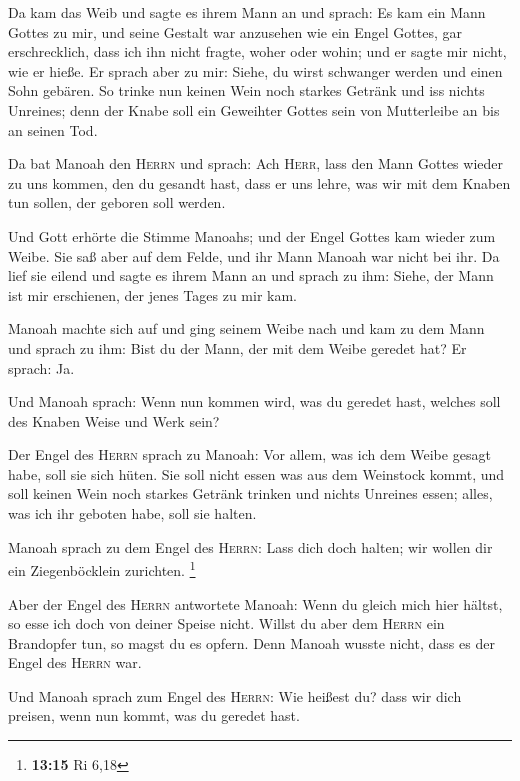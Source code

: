  Da kam das Weib und sagte es ihrem Mann an und sprach: Es
kam ein Mann Gottes zu mir, und seine Gestalt war anzusehen wie ein
Engel Gottes, gar erschrecklich, dass ich ihn nicht fragte, woher oder
wohin; und er sagte mir nicht, wie er hieße.  Er sprach
aber zu mir: Siehe, du wirst schwanger werden und einen Sohn gebären. So
trinke nun keinen Wein noch starkes Getränk und iss nichts Unreines;
denn der Knabe soll ein Geweihter Gottes sein von Mutterleibe an bis an
seinen Tod.

 Da bat Manoah den \textsc{Herrn} und sprach: Ach
\textsc{Herr}, lass den Mann Gottes wieder zu uns kommen, den du gesandt
hast, dass er uns lehre, was wir mit dem Knaben tun sollen, der geboren
soll werden.

 Und Gott erhörte die Stimme Manoahs; und der Engel Gottes
kam wieder zum Weibe. Sie saß aber auf dem Felde, und ihr Mann Manoah
war nicht bei ihr.  Da lief sie eilend und sagte es ihrem
Mann an und sprach zu ihm: Siehe, der Mann ist mir erschienen, der jenes
Tages zu mir kam.

 Manoah machte sich auf und ging seinem Weibe nach und
kam zu dem Mann und sprach zu ihm: Bist du der Mann, der mit dem Weibe
geredet hat? Er sprach: Ja.

 Und Manoah sprach: Wenn nun kommen wird, was du geredet
hast, welches soll des Knaben Weise und Werk sein?

 Der Engel des \textsc{Herrn} sprach zu Manoah: Vor
allem, was ich dem Weibe gesagt habe, soll sie sich hüten.
 Sie soll nicht essen was aus dem Weinstock kommt, und
soll keinen Wein noch starkes Getränk trinken und nichts Unreines essen;
alles, was ich ihr geboten habe, soll sie halten.

 Manoah sprach zu dem Engel des \textsc{Herrn}: Lass dich
doch halten; wir wollen dir ein Ziegenböcklein zurichten. \footnote{\textbf{13:15}
  Ri 6,18}

 Aber der Engel des \textsc{Herrn} antwortete Manoah:
Wenn du gleich mich hier hältst, so esse ich doch von deiner Speise
nicht. Willst du aber dem \textsc{Herrn} ein Brandopfer tun, so magst du
es opfern. Denn Manoah wusste nicht, dass es der Engel des
\textsc{Herrn} war.

 Und Manoah sprach zum Engel des \textsc{Herrn}: Wie
heißest du? dass wir dich preisen, wenn nun kommt, was du geredet hast.

